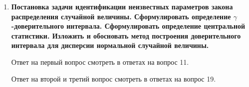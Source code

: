 \documentclass[12pt]{report}
\begin{document}
\begin{enumerate}
	\begin{figure}[!h]
	\end{figure}
	\begin{figure}[!h]
	\end{figure}

	\clearpage
	
	\item \textbf{Постановка задачи идентификации неизвестных параметров закона распределения случайной величины. Сформулировать определение $\gamma$-доверительного интервала. Сформулировать
		определение центральной статистики. Изложить и обосновать метод построения доверительного интервала для дисперсии нормальной случайной величины.}
	
	Ответ на первый вопрос смотреть в ответах на вопрос 11.
	
	Ответ на второй и третий вопрос смотреть в ответах на вопрос 19.
	
	\begin{figure}[!h]
	\end{figure}
	
\end{enumerate}
\end{document}
